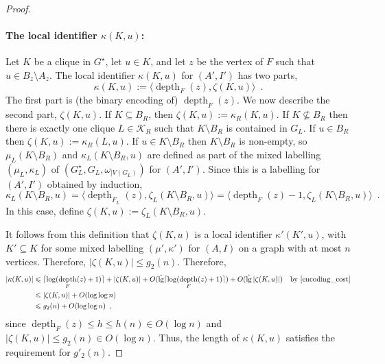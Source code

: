 \documentclass{patmorin}
\let\eqref\cref
\renewcommand{\le}{\leqslant}
\renewcommand{\leq}{\leqslant}
\DeclareMathOperator{\depth}{depth}
\DeclareMathOperator{\lgg}{\hat{lg}}
\newcommand{\Oh}{O}
\DeclarePairedDelimiter{\ceil}{\lceil}{\rceil}
\begin{document}
\begin{proof}
  \paragraph{\boldmath The local identifier $\kappa(K,u)$:}
  Let $K$ be a clique in $G^\star$, let $u\in K$, and let $z$ be the vertex of $F$ such that $u\in B_z\setminus A_z$.   The local identifier $\kappa(K,u)$ for $(A',I')$ has two parts,
  \[
    \kappa(K,u) := \langle\depth_F(z),\zeta(K,u)\rangle \enspace .
  \]
  The first part is (the binary encoding of) $\depth_F(z)$. We now describe the second part, $\zeta(K,u)$.  If $K\subseteq B_R$, then $\zeta(K,u):=\kappa_R(K,u)$.
  If $K\not\subseteq B_R$ then there is exactly one clique $L\in\mathcal{K}_R$ such that $K\setminus B_R$ is contained in $G_L$.  If $u\in B_R$ then $\zeta(K,u):=\kappa_R(L,u)$.  If $u\in K\setminus B_R$ then $K\setminus B_R$ is non-empty, so $\mu_L(K\setminus B_R)$ and  $\kappa_L(K\setminus B_R, u)$ are defined as part of the mixed labelling $(\mu_L,\kappa_L)$ of $(G^\star_L,G_L,\omega_{|V(G_L)})$ for $(A',I')$.
  Since this is a labelling for $(A',I')$ obtained by induction,
  \begin{equation}
    \kappa_L(K\setminus B_R,u)=\langle\depth_{F_L}(z),\zeta_{L}(K\setminus B_R,u)\rangle=\langle\depth_F(z)-1,\zeta_L(K\setminus B_R,u)\rangle\enspace.
    \label{off_by_one}
  \end{equation}
  In this case, define $\zeta(K,u):=\zeta_L(K\setminus B_R,u)$.

  It follows from this definition that $\zeta(K,u)$ is a local identifier $\kappa'(K',u)$, with $K'\subseteq K$ for some mixed labelling $(\mu',\kappa')$ for $(A,I)$ on a graph with at most $n$ vertices.  Therefore, $|\zeta(K,u)|\le g_2(n)$.  Therefore,
  \begin{align*}
    |\kappa(K,u)|
     & \le \ceil{\log(\depth_F(z)+1)} + |\zeta(K,u)|
    + \Oh(\lgg\ceil{\log(\depth_F(z)+1)}) + \Oh(\lgg|\zeta(K,u)|)
     & \text{by \eqref{encoding_cost}}               \\
     & \leq |\zeta(K,u)| + \Oh(\log\log n)           \\
     & \leq g_2(n) +  \Oh(\log\log n)\enspace,
  \end{align*}
  since $\depth_F(z)\le h\le h(n)\in \Oh(\log n)$ and $|\zeta(K,u)|\le g_2(n)\in\Oh(\log n)$.  Thus, the length of $\kappa(K,u)$ satisfies the requirement for $g'_2(n)$.


\end{proof}
\end{document}
